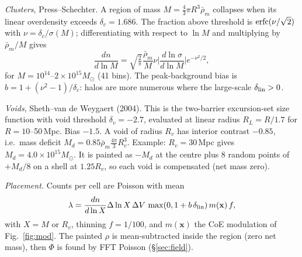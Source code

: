 \documentclass[10pt,twocolumn]{article}
\begin{document}
\emph{Clusters}, Press--Schechter. A region of mass $M=\tfrac43\pi R^3\bar\rho_m$ collapses when its linear overdensity exceeds $\delta_c=1.686$. The fraction above threshold is ${\rm erfc}(\nu/\sqrt2)$ with $\nu=\delta_c/\sigma(M)$; differentiating with respect to $\ln M$ and multiplying by $\bar\rho_m/M$ gives
\begin{equation}
\frac{dn}{d\ln M}=\sqrt{\tfrac2\pi}\frac{\bar\rho_m}{M}\nu\Big|\frac{d\ln\sigma}{d\ln M}\Big|e^{-\nu^2/2},
\end{equation}
for $M=10^{14}$--$2\times10^{15}M_\odot$ (41 bins). The peak-background bias is $b=1+(\nu^2-1)/\delta_c$: halos are more numerous where the large-scale $\delta_{\rm lin}>0$.

\emph{Voids}, Sheth--van de Weygaert (2004). This is the two-barrier excursion-set size function with void threshold $\delta_v=-2.7$, evaluated at linear radius $R_L=R/1.7$ for $R=10$--50\,Mpc. Bias $-1.5$. A void of radius $R_v$ has interior contrast $-0.85$, i.e.\ mass deficit $M_d=0.85\bar\rho_m\tfrac{4\pi}{3}R_v^3$. Example: $R_v=30$\,Mpc gives $M_d=4.0\times10^{15}M_\odot$. It is painted as $-M_d$ at the centre plus 8 random points of $+M_d/8$ on a shell at $1.25R_v$, so each void is compensated (net mass zero).

\emph{Placement.} Counts per cell are Poisson with mean
\begin{equation}
\lambda=\frac{dn}{d\ln X}\Delta\ln X\,\Delta V\,\max(0,1+b\,\delta_{\rm lin})\,m(\mathbf x)\,f ,
\end{equation}
with $X=M$ or $R_v$, thinning $f=1/100$, and $m(\mathbf x)$ the CoE modulation of Fig.~\ref{fig:mod}. The painted $\rho$ is mean-subtracted inside the region (zero net mass), then $\Phi$ is found by FFT Poisson (\S\ref{sec:field}).
\end{document}
